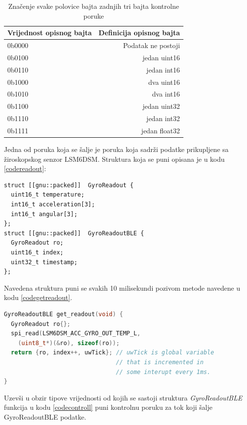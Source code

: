 \documentclass[times, utf8, diplomski]{diplomski}
\begin{document}
\begin{table}[H]
  \begin{center}
    \begin{tabular}[c]{l|r}
      \multicolumn{1}{c|}{\textbf{Vrijednost opisnog bajta}} & 
      \multicolumn{1}{c}{\textbf{Definicija opisnog bajta}} \\
      \hline
      0b0000 & Podatak ne postoji \\
      0b0100 & jedan uint16 \\
      0b0110 & jedan int16 \\
      0b1000 & dva uint16 \\
      0b1010 & dva int16 \\
      0b1100 & jedan uint32 \\
      0b1110 & jedan int32 \\
      0b1111 & jedan float32 \\
      \hline
    \end{tabular}
  \caption{Značenje svake polovice bajta zadnjih tri bajta kontrolne poruke}
  \end{center}
\end{table}

Jedna od poruka koja se šalje je poruka koja sadrži podatke prikupljene sa žiroskopskog senzor LSM6DSM. Struktura koja se puni opisana je u kodu \ref{codereadout}:

\begin{lstlisting}[caption = {Definicija strukure koja se šalje bluetoothom}, label={codereadout}]
 struct [[gnu::packed]]  GyroReadout {
  uint16_t temperature;
  int16_t acceleration[3];
  int16_t angular[3];
};
struct [[gnu::packed]]  GyroReadoutBLE {
  GyroReadout ro;
  uint16_t index;
  uint32_t timestamp;
};
\end{lstlisting}

Navedena struktura puni se svakih 10 milisekundi pozivom metode navedene u kodu \ref{codegetreadout}.

\begin{lstlisting}[language=c++, caption={Dohvaćanje očitanja s LSM6DSM senzora}, label={codegetreadout}]
GyroReadoutBLE get_readout(void) {
  GyroReadout ro{};
  spi_read(LSM6DSM_ACC_GYRO_OUT_TEMP_L,
    (uint8_t*)(&ro), sizeof(ro));
  return {ro, index++, uwTick}; // uwTick is global variable
                                // that is incremented in 
                                // some interupt every 1ms.
}
\end{lstlisting}

Uzevši u obzir tipove vrijednosti od kojih se sastoji struktura \textit{GyroReadoutBLE} funkcija u kodu \ref{codecontroll} puni kontrolnu poruku za tok koji šalje GyroReadoutBLE podatke.
\end{document}
